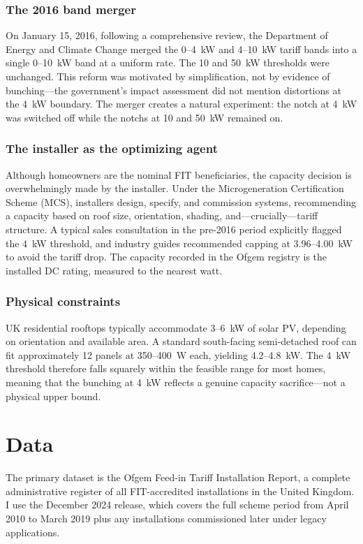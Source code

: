 \documentclass[12pt]{article}
\begin{document}
\subsubsection*{The 2016 band merger} On January 15, 2016, following a comprehensive review, the Department of Energy and Climate Change merged the 0--4~kW and 4--10~kW tariff bands into a single 0--10~kW band at a uniform rate. The 10 and 50~kW thresholds were unchanged. This reform was motivated by simplification, not by evidence of bunching---the government's impact assessment did not mention distortions at the 4~kW boundary. The merger creates a natural experiment: the notch at 4~kW was switched off while the notchs at 10 and 50~kW remained on.

\subsubsection*{The installer as the optimizing agent} Although homeowners are the nominal FIT beneficiaries, the capacity decision is overwhelmingly made by the installer. Under the Microgeneration Certification Scheme (MCS), installers design, specify, and commission systems, recommending a capacity based on roof size, orientation, shading, and---crucially---tariff structure. A typical sales consultation in the pre-2016 period explicitly flagged the 4~kW threshold, and industry guides recommended capping at 3.96--4.00~kW to avoid the tariff drop. The capacity recorded in the Ofgem registry is the installed DC rating, measured to the nearest watt.

\subsubsection*{Physical constraints} UK residential rooftops typically accommodate 3--6~kW of solar PV, depending on orientation and available area. A standard south-facing semi-detached roof can fit approximately 12 panels at 350--400~W each, yielding 4.2--4.8~kW. The 4~kW threshold therefore falls squarely within the feasible range for most homes, meaning that the bunching at 4~kW reflects a genuine capacity sacrifice---not a physical upper bound.


\section{Data}
\label{sec:data}

The primary dataset is the Ofgem Feed-in Tariff Installation Report, a complete administrative register of all FIT-accredited installations in the United Kingdom. I use the December 2024 release, which covers the full scheme period from April 2010 to March 2019 plus any installations commissioned later under legacy applications.
\end{document}
